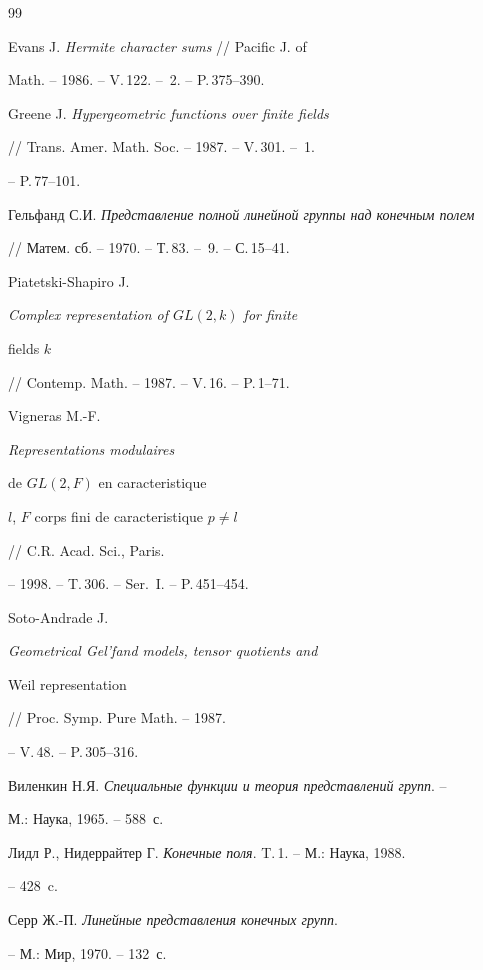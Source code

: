\begin{thebibliography}{99}







Evans J. {\em Hermite character sums} // Pacific J. of


Math. -- 1986. -- V.\,122. --  \No\,2. -- P.\,375--390.




Greene J. {\em Hypergeometric functions over finite fields}


// Trans. Amer. Math. Soc. -- 1987. -- V.\,301. -- \No\,1.


-- P.\,77--101.




Гельфанд С.И. {\em Представление полной линейной группы над конечным полем}


// Матем. сб. -- 1970. -- Т.\,83. -- \No\,9. -- С.\,15--41.




Piatetski-Shapiro J. {\em Complex representation of $GL(2,k)$ for finite


fields $k$} // Contemp. Math. -- 1987. -- V.\,16. -- P.\,1--71.




Vigneras M.-F. {\em Representations modulaires


de $GL(2,F)$ en caracteristique


$l$, $F$ corps fini de caracteristique $p\neq l$} // C.R. Acad. Sci., Paris.


-- 1998. -- T.\,306. -- Ser.~I. -- P.\,451--454.




Soto-Andrade J. {\em Geometrical Gel'fand models, tensor quotients and


Weil representation} // Proc. Symp. Pure Math. -- 1987.


-- V.\,48. -- P.\,305--316.




Виленкин Н.Я. {\em Специальные функции и теория представлений групп}. --


М.: Наука, 1965. -- 588~с.




Лидл Р., Нидеррайтер Г. {\em Конечные поля}. T.\,1. -- М.: Наука, 1988.


-- 428~c.




Серр Ж.-П. {\em Линейные представления конечных групп}.


-- М.: Мир, 1970. -- 132~с.








\end{thebibliography}





\vskip 2cm












\label{end}








